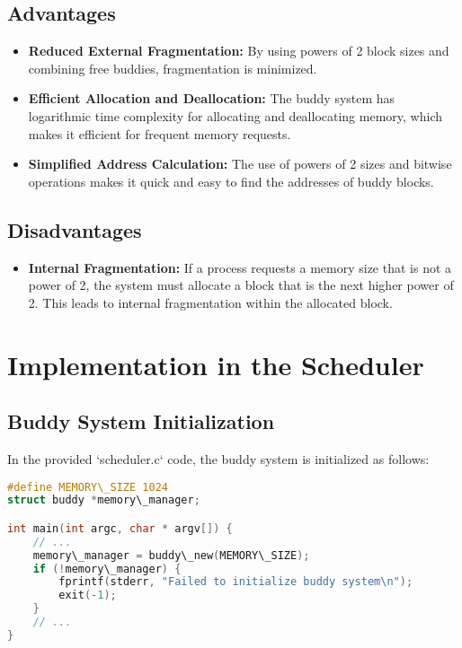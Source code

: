 \documentclass{article}
\begin{document}
\subsection{Advantages}
\begin{itemize}
    \item \textbf{Reduced External Fragmentation:} By using powers of 2 block sizes and combining free buddies, fragmentation is minimized.
    \item \textbf{Efficient Allocation and Deallocation:} The buddy system has logarithmic time complexity for allocating and deallocating memory, which makes it efficient for frequent memory requests.
    \item \textbf{Simplified Address Calculation:} The use of powers of 2 sizes and bitwise operations makes it quick and easy to find the addresses of buddy blocks.
\end{itemize}

\subsection{Disadvantages}
\begin{itemize}
    \item \textbf{Internal Fragmentation:} If a process requests a memory size that is not a power of 2, the system must allocate a block that is the next higher power of 2. This leads to internal fragmentation within the allocated block.
\end{itemize}


\section{Implementation in the Scheduler}

\subsection{Buddy System Initialization}

In the provided `scheduler.c` code, the buddy system is initialized as follows:

\begin{lstlisting}[language=C, caption=Buddy System Initialization in scheduler.c]
#define MEMORY\_SIZE 1024
struct buddy *memory\_manager;

int main(int argc, char * argv[]) {
    // ...
    memory\_manager = buddy\_new(MEMORY\_SIZE);
    if (!memory\_manager) {
        fprintf(stderr, "Failed to initialize buddy system\n");
        exit(-1);
    }
    // ...
}
\end{lstlisting}
\end{document}
